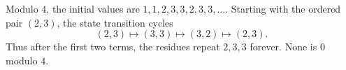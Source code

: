Modulo $4$, the initial values are $1,1,2,3,3,2,3,3,\ldots$. Starting with the ordered pair $(2,3)$, the state transition cycles
\[
(2,3)\longmapsto(3,3)\longmapsto(3,2)\longmapsto(2,3).
\]
Thus after the first two terms, the residues repeat $2,3,3$ forever. None is $0$ modulo $4$.
